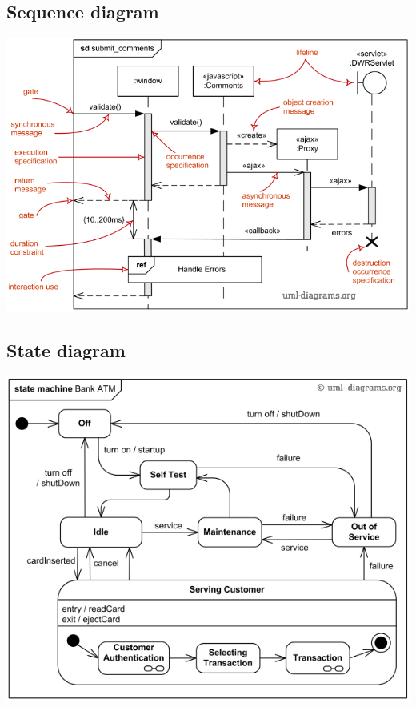 \subsection{Sequence diagram}
\includegraphics[width=\linewidth]{4-uml/sequence.png}

\subsection{State diagram}
\includegraphics[width=\linewidth]{4-uml/state.png}

